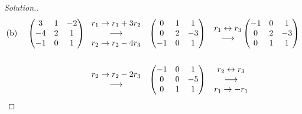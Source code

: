 \documentclass[11pt,a4paper]{article}
\theoremstyle{definition}
\newenvironment{solution}
  {\renewcommand{\qedsymbol}{}\begin{proof}[\textit{Solution}.]}
  {\end{proof}}
\begin{document}
\begin{solution}
\begin{align*}
\text{(b)}\hspace{0.4cm}
\begin{pmatrix}
3&1&-2\\ -4&2&1\\-1&0&1\\
\end{pmatrix}
&\hspace{0.3cm}
\begin{matrix}
r_1\rightarrow r_1+3r_2\\ \longrightarrow\\ r_2\rightarrow r_2-4r_3\\
\end{matrix}
\hspace{0.3cm}
\begin{pmatrix}
0&1&1\\0&2&-3\\-1&0&1\\
\end{pmatrix}
\hspace{0.3cm}
\begin{matrix}
r_1\leftrightarrow r_3\\ \longrightarrow\\
\end{matrix}
\begin{pmatrix}
-1&0&1\\0&2&-3\\0&1&1\\
\end{pmatrix}\\\\
&\hspace{0.3cm}
\begin{matrix}
r_2\rightarrow r_2-2r_3\\ \longrightarrow\\
\end{matrix}
\hspace{0.3cm}
\begin{pmatrix}
-1&0&1\\0&0&-5\\0&1&1\\
\end{pmatrix}
\hspace{0.3cm}
\begin{matrix}
r_2\leftrightarrow r_3\\ \longrightarrow\\ r_1\rightarrow -r_1\\
\end{matrix}

\end{align*}
\end{solution}
\end{document}
